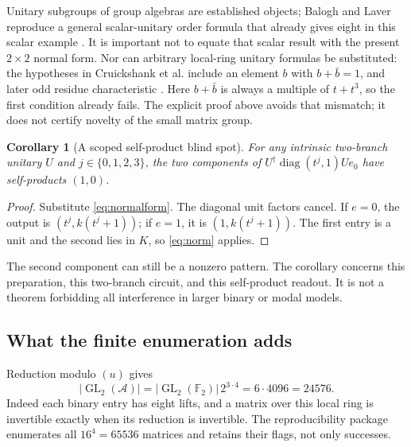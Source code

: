 \documentclass[11pt,a4paper]{article}
\newtheorem{corollary}[theorem]{Corollary}
\theoremstyle{definition}\newtheorem{definition}[theorem]{Definition}
\theoremstyle{remark}\newtheorem{remark}[theorem]{Remark}
\newcommand{\F}{\mathbb F}
\newcommand{\A}{\mathcal A}
\newcommand{\GL}{\operatorname{GL}}
\newcommand{\diag}{\operatorname{diag}}
\numberwithin{equation}{section}
\begin{document}
Unitary subgroups of group algebras are established objects; Balogh and Laver reproduce a general scalar-unitary order formula that already gives eight in this scalar example \cite{BaloghLaver}. It is important not to equate that scalar result with the present $2\times2$ normal form. Nor can arbitrary local-ring unitary formulas be substituted: the hypotheses in Cruickshank et al. include an element $b$ with $b+\bar b=1$, and later odd residue characteristic \cite{LocalUnitary}. Here $b+\bar b$ is always a multiple of $t+t^3$, so the first condition already fails. The explicit proof above avoids that mismatch; it does not certify novelty of the small matrix group.

\begin{corollary}[A scoped self-product blind spot]\label{cor:blind}
For any intrinsic two-branch unitary $U$ and $j\in\{0,1,2,3\}$, the two components of
$U^\dagger\diag(t^j,1)Ue_0$ have self-products $(1,0)$.
\end{corollary}
\begin{proof}
Substitute \eqref{eq:normalform}. The diagonal unit factors cancel. If $e=0$, the output is $(t^j,k(t^j+1))$; if $e=1$, it is $(1,k(t^j+1))$. The first entry is a unit and the second lies in $K$, so \eqref{eq:norm} applies.
\end{proof}
The second component can still be a nonzero pattern. The corollary concerns this preparation, this two-branch circuit, and this self-product readout. It is not a theorem forbidding all interference in larger binary or modal models.

\subsection{What the finite enumeration adds}
Reduction modulo $(u)$ gives
\[
 |\GL_2(\A)|=|\GL_2(\F_2)|\,2^{3\cdot4}=6\cdot4096=24576.
\]
Indeed each binary entry has eight lifts, and a matrix over this local ring is invertible exactly when its reduction is invertible. The reproducibility package enumerates all $16^4=65536$ matrices and retains their flags, not only successes.
\end{document}
